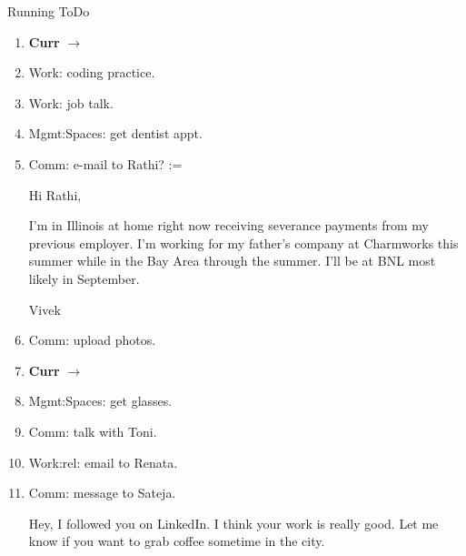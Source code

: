 \begin{columns}
\begin{column}{0.6\linewidth}
\begin{block}{Running ToDo}

      \begin{enumerate}

        
      \item \tiny \textbf{Curr} $\rightarrow$ 
        
      \item \tiny Work: coding practice. 
      \item \tiny Work: job talk.

      \item \tiny Mgmt:Spaces: get dentist appt.
 
      \item \tiny Comm: e-mail to Rathi?  := 
        
        Hi Rathi, 
        
        I'm in Illinois at home right now receiving severance payments from my
        previous employer. I'm working for my father's company at Charmworks
        this summer while in the Bay Area through the summer. I'll be
        at BNL most likely in September.
        
        Vivek

      
      \item \tiny Comm: upload photos.
        
      \item \tiny \textbf{Curr} $\rightarrow$ 

      \item \tiny Mgmt:Spaces: get glasses. 
  
      \item \tiny Comm: talk with Toni. 
      \item \tiny Work:rel: email to Renata.  
      \item \tiny Comm: message to Sateja.
        
        Hey, I followed you on LinkedIn. I think your work is really good. 
        Let me know if you want to grab coffee sometime in the city. 
        

\end{enumerate}
\end{block}
\end{column}
\end{columns}
